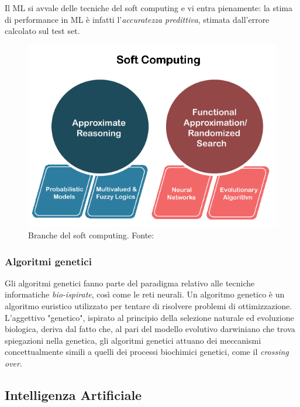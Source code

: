 Il ML si avvale delle tecniche del soft computing \supercite{MLwiki} e vi entra pienamente: la stima di performance in ML è infatti l'\textit{accuratezza predittiva}, stimata dall'errore calcolato sul test set.

\begin{figure}[!h]
	\centering
	\includegraphics[scale=0.4]{images/soft-computing.png}
	\caption{Branche del soft computing. Fonte: \cite{softComputing}}
	\label{fig:soft-computing}
\end{figure}

\subsubsection{Algoritmi genetici}

\par Gli algoritmi genetici fanno parte del paradigma relativo alle tecniche informatiche \textit{bio-ispirate}, così come le reti neurali. Un algoritmo genetico è un algoritmo euristico utilizzato per tentare di risolvere problemi di ottimizzazione. L'aggettivo "genetico", ispirato al principio della selezione naturale ed evoluzione biologica, deriva dal fatto che, al pari del modello evolutivo darwiniano che trova spiegazioni nella genetica, gli algoritmi genetici attuano dei meccanismi concettualmente simili a quelli dei processi biochimici genetici, come il \textit{crossing over}.

\subsection{Intelligenza Artificiale}

